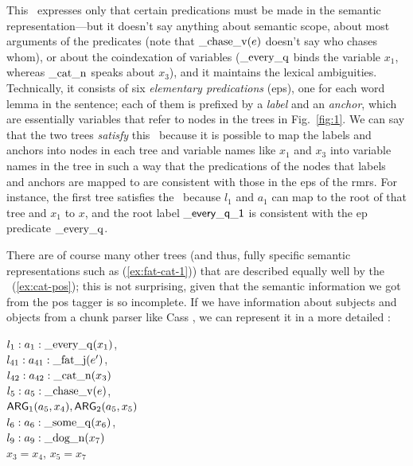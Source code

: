 This \rmrs\ expresses only that certain predications must be made in
the semantic representation---but it doesn't say anything about
semantic scope, about most arguments of the
predicates (note that $\mathrm{\_chase\_v}(e)$ doesn't say who chases
whom), or about the coindexation of variables ($\mathrm{\_every\_q}$
binds the variable $x_1$, whereas $\mathrm{\_cat\_n}$ speaks about
$x_3$), and it maintains the lexical ambiguities.  Technically, it
consists of six \emph{elementary predications} ({\sc ep}s), one for
each word lemma in the sentence; each of them is prefixed by a
\emph{label} and an \emph{anchor}, which are essentially variables
that refer to nodes in the trees in Fig.~\ref{fig:1}.  We can say that
the two trees \emph{satisfy} this \rmrs\ because it is possible to map
the labels and anchors into nodes in each tree and variable names like
$x_1$ and $x_3$ into variable names in the tree in such a way that the
predications of the nodes that labels and anchors are mapped to are 
consistent with those in the {\sc ep}s of the {\sc rmrs}.  For
instance, the first tree satisfies the \rmrs\ because $l_1$ and $a_1$
can map to the root of that tree and $x_1$ to $x$, and the root label
$\mathsf{\_every\_q\_1}$ is consistent with the {\sc ep} predicate
$\mathrm{\_every\_q}$.


There are of course many other trees (and thus, fully specific
semantic representations such as (\ref{ex:fat-cat-1})) that are
described equally well by the \rmrs\ (\ref{ex:cat-pos}); this is not
surprising, given that the semantic information we got from the {\sc
  pos} tagger is so incomplete.  If we have
information about subjects and objects from a chunk parser
like Cass \cite{abney:1996}, we can represent it in a more detailed
\rmrs:

\begin{examples}
\item 
$l_1:a_1:\mathrm{\_every\_q}(x_1)$, \\
$l_{41}:a_{41}:\mathrm{\_fat\_j}(e')$,\\
$l_{42}:a_{42}:\mathrm{\_cat\_n}(x_3)$\\
$l_5:a_5:\mathrm{\_chase\_v}(e)$, \\
\hspace*{0.1in} $\mathsf{ARG}_1(a_5,x_4),
\mathsf{ARG}_2(a_5,x_5)$\\ 
$l_6:a_6:\mathrm{\_some\_q}(x_6)$, \\
$l_9:a_9:\mathrm{\_dog\_n}(x_7)$\\
$x_3=x_4$, $x_5=x_7$
\label{ex:cat-partial-parser}
\end{examples}

